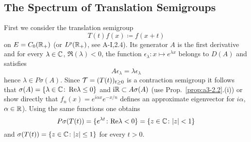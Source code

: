 \subsection{The Spectrum of Translation Semigroups}\label{subsec:a3-2.4}
First we consider the translation semigroup
\[
T(t)f(x) \coloneqq f(x+t)
\]
on $E = C_{0}(\mathbb{R}_{+})$ (or $L^{p}(\mathbb{R}_{+})$, see A-I,2.4).
Its generator $A$ is the first derivative and for every $\lambda \in \mathbb{C}$, $\Re(\lambda) < 0$, the function $\epsilon_{\lambda} \colon x \mapsto e^{\lambda x}$ belongs to $D(A)$ and satisfies
\[
A\epsilon_{\lambda} = \lambda\epsilon_{\lambda}
\]
hence $\lambda \in P\sigma(A)$.
Since $\mathcal{T} = (T(t))_{t \geq 0}$ is a contraction semigroup it follows that $\sigma(A) = \{\lambda \in \mathbb{C} \colon \mathop{}\!\mathrm{Re} \lambda \leq 0\}$ and $\mathrm{i}\mathbb{R} \subset A\sigma(A)$ (use Prop.~\ref{prop:a3-2.2}.(i)) or show directly that $f_{n}(x) = e^{i\alpha x}e^{-x/n}$ defines an approximate eigenvector for $i\alpha$, $\alpha \in \mathbb{R}$).
Using the same functions one obtains
\[
P\sigma(T(t)) = \{e^{\lambda t} \colon \text{Re}\lambda < 0\} = \{z \in \mathbb{C} \colon |z| < 1\}
\]
and $\sigma(T(t)) = \{z \in \mathbb{C} \colon |z| \leq 1\}$ for every $t > 0$.

